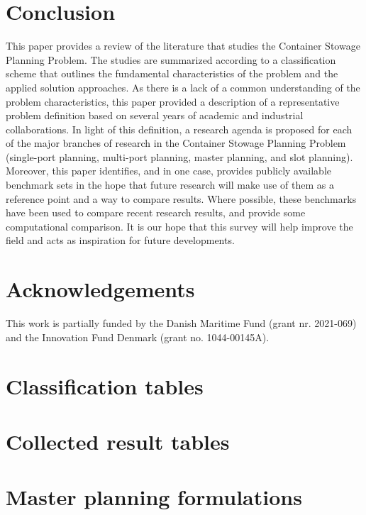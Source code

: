 \documentclass[preprint,12pt,authoryear]{elsarticle}
\begin{document}
\section{Conclusion}
\label{sec:conclusion}
This paper provides a review of the literature that studies the Container Stowage Planning Problem. The studies are summarized according to a classification scheme that outlines the fundamental characteristics of the problem and the applied solution approaches. As there is a lack of a common understanding of the problem characteristics, this paper provided a description of a representative problem definition based on several years of academic and industrial collaborations. In light of this definition, a research agenda is proposed for each of the major branches of research in the Container Stowage Planning Problem (single-port planning, multi-port planning, master planning, and slot planning). Moreover, this paper identifies, and in one case, provides publicly available benchmark sets in the hope that future research will make use of them as a reference point and a way to compare results. Where possible, these benchmarks have been used to compare recent research results, and provide some computational comparison. It is our hope that this survey will help improve the field and acts as inspiration for future developments.

\section*{Acknowledgements}
This work is partially funded by the Danish Maritime Fund (grant nr. 2021-069) and the Innovation Fund Denmark (grant no. 1044-00145A).

\clearpage
\appendix
\section{Classification tables}
\label{app:classification_tables}

\clearpage
\section{Collected result tables}
\label{app:result_tables}

\clearpage
\section{Master planning formulations}


\def\urlprefix{}
\def\url#1{}



\end{document}
